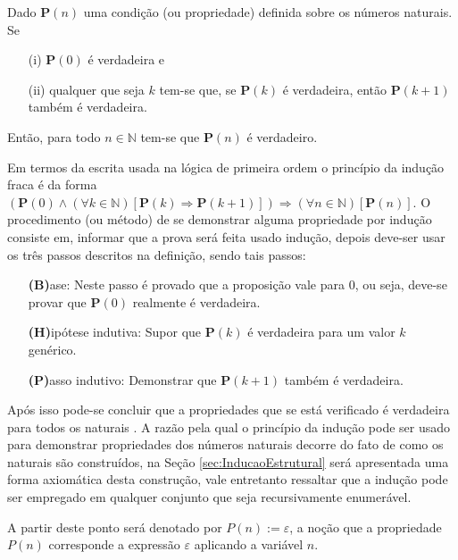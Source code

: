 \begin{definicao}\label{def:InducaoFraca}
	Dado \textbf{P}$(n)$ uma condição (ou propriedade) definida sobre os números naturais. Se
	\begin{itemize}
		\item[(i)] \textbf{P}$(0)$ é verdadeira e
		\item[(ii)] qualquer que seja $k$ tem-se que, se \textbf{P}$(k)$ é verdadeira, então \textbf{P}$(k + 1)$ também é verdadeira. 
	\end{itemize}
	Então, para todo $n \in \mathbb{N}$  tem-se que $\textbf{P}(n)$ é verdadeiro.
\end{definicao}

Em termos da escrita usada na lógica de primeira ordem o princípio da indução fraca é da forma $(\textbf{P}(0) \land (\forall k \in \mathbb{N})[\textbf{P}(k) \Rightarrow \textbf{P}(k+1)]) \Rightarrow (\forall n \in \mathbb{N})[\textbf{P}(n)]$.  O procedimento (ou método) de se demonstrar alguma propriedade por indução consiste em,  informar que a prova será feita usado indução, depois deve-ser usar os três passos descritos na definição, sendo tais passos:

\begin{itemize}
	\item[ ] \textbf{(B)}ase: Neste passo é provado que a proposição vale para $0$, ou seja, deve-se provar que $\textbf{P}(0)$ realmente é verdadeira.
	\item[ ] \textbf{(H)}ipótese indutiva: Supor que $\textbf{P}(k)$ é verdadeira para um valor $k$ genérico.
	\item[ ] \textbf{(P)}asso indutivo: Demonstrar que $\textbf{P}(k + 1)$ também é verdadeira.
\end{itemize}

Após isso pode-se concluir que a propriedades que se está verificado é verdadeira para todos os naturais \cite{carmo2013}. A razão pela qual o princípio da indução pode ser usado para demonstrar propriedades dos números naturais decorre do fato de como os naturais são construídos, na Seção \ref{sec:InducaoEstrutural} será apresentada uma forma axiomática desta construção, vale entretanto ressaltar que a indução pode ser empregado em qualquer conjunto que seja recursivamente enumerável.

\begin{nota}
	A partir deste ponto será denotado por $P(n) :=  \varepsilon$, a noção que a propriedade $P(n)$ corresponde a expressão $\varepsilon$ aplicando a variável $n$.
\end{nota}

